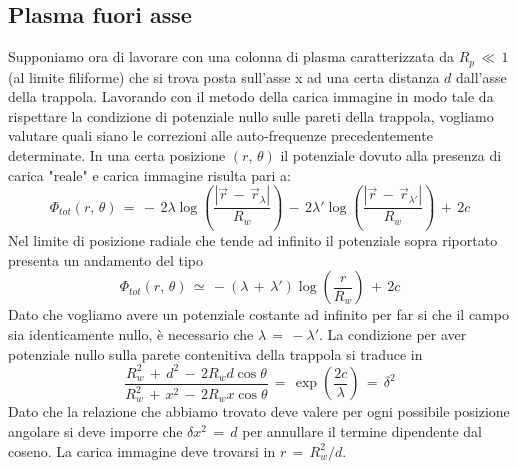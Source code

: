 \subsection{Plasma fuori asse}

Supponiamo ora di lavorare con una colonna di plasma caratterizzata da $R_p\,\ll\,1$ (al limite filiforme) che si trova posta 
sull'asse x ad una certa distanza $d$ dall'asse della trappola. Lavorando con il metodo della carica immagine in modo tale da
rispettare la condizione di potenziale nullo sulle pareti della trappola, vogliamo valutare quali siano le correzioni alle 
auto-frequenze precedentemente determinate. In una certa posizione $\left(r,\,\theta\right)$ il potenziale dovuto alla presenza 
di carica "reale" e carica immagine risulta pari a:
\begin{equation}
    \Phi_{tot}\left(r,\,\theta\right)\,=\,-\,2\lambda\log{\left(\frac{\left|\vec{r}\,-\,\vec{r}_\lambda\right|}{R_w}\right)}\,-\,2\lambda'\log{\left(\frac{\left|\vec{r}\,-\,\vec{r}_{\lambda'}\right|}{R_w}\right)\,+\,2c}
    \label{equation: potentialOffset}
\end{equation}
Nel limite di posizione radiale che tende ad infinito il potenziale sopra riportato presenta un andamento del tipo
\begin{equation}
    \Phi_ {tot}\left(r,\,\theta\right)\,\simeq\,-\left(\lambda\,+\,\lambda'\right)\log{\left(\frac{r}{R_w}\right)}\,+\,2c
    \label{equation: potentialOffset_rInf}
\end{equation}
Dato che vogliamo avere un potenziale costante ad infinito per far si che il campo sia identicamente nullo, è necessario che 
$\lambda\,=\,-\lambda'$. La condizione per aver potenziale nullo sulla parete contenitiva della trappola si traduce in
\begin{equation}
    \frac{R_w^2\,+\,d^2\,-\,2R_wd\cos{\theta}}{R_w^2\,+\,x^2\,-\,2R_wx\cos{\theta}}\,=\,\exp{\left(\frac{2c}{\lambda}\right)\,=\,\delta^2}
    \label{equation: cond_PotNullo}
\end{equation}
Dato che la relazione che abbiamo trovato deve valere per ogni possibile posizione angolare si deve imporre che $\delta x^2\,=\,d$ per 
annullare il termine dipendente dal coseno. La carica immagine deve trovarsi in $r\,=\,R_w^2/d$.


